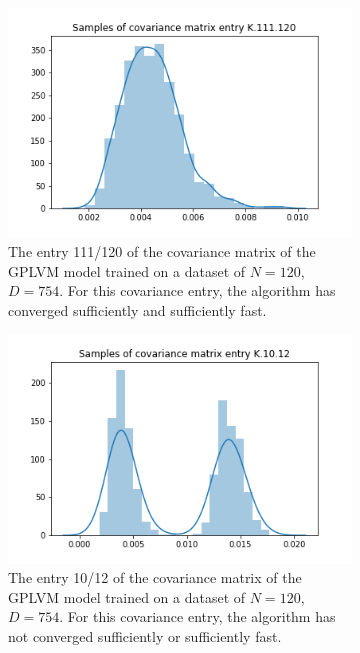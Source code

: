 \begin{figure}[h!]%
	\centering
	\begin{subfigure}[b]{0.4\textwidth}
		\includegraphics[width=\textwidth]{img/07_0/K_111_120_samples.png}
		\caption{The entry 111/120 of the covariance matrix of the GPLVM model trained on a dataset of $N=120$, $D=754$. For this covariance entry, the algorithm has converged sufficiently and sufficiently fast.}
		\label{fig:K_111_120_gplvm}
	\end{subfigure}
	\begin{subfigure}[b]{0.4\textwidth}
		\includegraphics[width=\textwidth]{img/07_0/K_10_12_samples.png}
		\caption{The entry 10/12 of the covariance matrix of the GPLVM model trained on a dataset of $N=120$, $D=754$. For this covariance entry, the algorithm has not converged sufficiently or sufficiently fast.}
		\label{fig:K_10_12_gplvm}
	\end{subfigure}
	\caption{}
	\label{fig:cov_entries_gplvm}
\end{figure}
